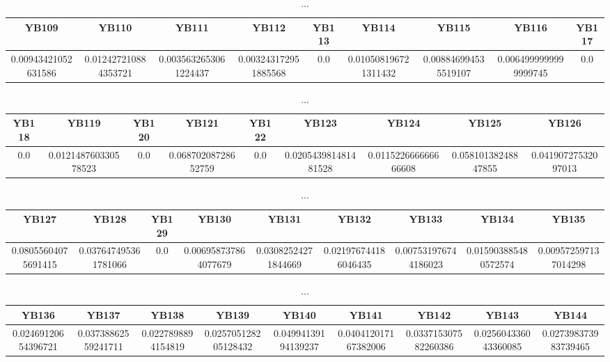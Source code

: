 \documentclass[]{article}
\begin{document}
\begin{table}[h]
      \centering
      \begin{tabular}{|c|c|c|c|c|c|c|c|c|}
            \hline
            YB109               & YB110                & YB111                 & YB112                & YB113 & YB114                & YB115                & YB116                 & YB117 \\
            \hline
            0.00943421052631586 & 0.012427210884353721 & 0.0035632653061224437 & 0.003243172951885568 & 0.0   & 0.010508196721311432 & 0.008846994535519107 & 0.0064999999999999745 & 0.0   \\
            \hline
      \end{tabular}
      \caption{...}
\end{table}
\begin{table}[h]
      \centering
      \begin{tabular}{|c|c|c|c|c|c|c|c|c|}
            \hline
            YB118 & YB119                & YB120 & YB121               & YB122 & YB123                & YB124                & YB125               & YB126               \\
            \hline
            0.0   & 0.012148760330578523 & 0.0   & 0.06870208728652759 & 0.0   & 0.020543981481481528 & 0.011522666666666608 & 0.05810138248847855 & 0.04190727532097013 \\
            \hline
      \end{tabular}
      \caption{...}
\end{table}
\begin{table}[h]
      \centering
      \begin{tabular}{|c|c|c|c|c|c|c|c|c|}
            \hline
            YB127               & YB128                & YB129 & YB130                & YB131               & YB132                & YB133                & YB134                & YB135                \\
            \hline
            0.08055604075691415 & 0.037647495361781066 & 0.0   & 0.006958737864077679 & 0.03082524271844669 & 0.021976744186046435 & 0.007531976744186023 & 0.015903885480572574 & 0.009572597137014298 \\
            \hline
      \end{tabular}
      \caption{...}
\end{table}
\begin{table}[h]
      \centering
      \begin{tabular}{|c|c|c|c|c|c|c|c|c|}
            \hline
            YB136               & YB137               & YB138              & YB139                & YB140               & YB141                & YB142                & YB143                & YB144                \\
            \hline
            0.02469120654396721 & 0.03738862559241711 & 0.0227898894154819 & 0.025705128205128432 & 0.04994139194139237 & 0.040412017167382006 & 0.033715307582260386 & 0.025604336043360085 & 0.027398373983739465 \\
            \hline
      \end{tabular}
      \caption{...}
\end{table}
\end{document}
